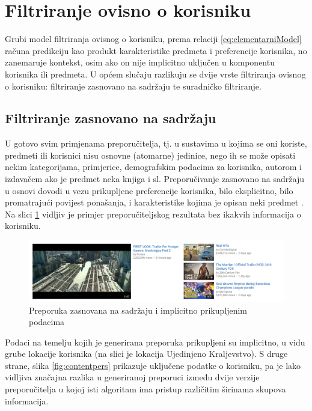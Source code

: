 \documentclass[times, utf8, diplomski, numeric]{fer}
\begin{document}
\section{Filtriranje ovisno o korisniku}
Grubi model filtriranja ovisnog o korisniku, prema relaciji
\ref{eq:elementarniModel} računa predikciju kao produkt karakteristike predmeta
i preferencije korisnika, no zanemaruje kontekst, osim ako on nije implicitno
uključen u komponentu korisnika ili predmeta. U općem slučaju razlikuju se dvije
vrste filtriranja ovisnog o korisniku: filtriranje zasnovano na sadržaju te
suradničko filtriranje.

\subsection{Filtriranje zasnovano na sadržaju}
U gotovo svim primjenama preporučitelja, tj. u sustavima u kojima se oni
koriste, predmeti ili korisnici nisu osnovne (atomarne) jedinice, nego ih se
može opisati nekim kategorijama, primjerice, demografskim podacima za korisnika,
autorom i izdavačem ako je predmet neka knjiga i sl. Preporučivanje zasnovano
na sadržaju u osnovi dovodi u vezu prikupljene preferencije korisnika, bilo
eksplicitno, bilo promatrajući povijest ponašanja, i karakteristike kojima je
opisan neki predmet \cite{RSHandbook}. Na slici \ref{fig:contentnonpers} vidljiv
je primjer preporučiteljskog rezultata bez ikakvih informacija o korisniku.

\begin{figure}[!htb]
	\centering
	\includegraphics[width=14.21cm]{images/content/nepersonalizirani.png}
	\caption{Preporuka zasnovana na sadržaju i implicitno prikupljenim podacima}
	\label{fig:contentnonpers}
\end{figure}

Podaci na temelju kojih je generirana preporuka prikupljeni su implicitno, u
vidu grube lokacije korisnika (na slici je lokacija Ujedinjeno Kraljevstvo). S
druge strane, slika \ref{fig:contentpers} prikazuje uključene podatke o
korisniku, pa je lako vidljiva značajna razlika u generiranoj preporuci između
dvije verzije preporučitelja u kojoj isti algoritam ima pristup različitim
širinama skupova informacija. 
\end{document}
